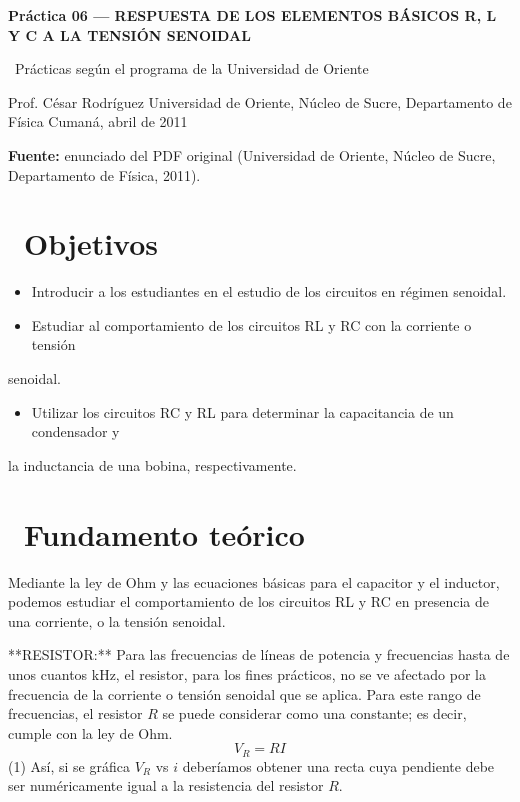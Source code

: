 \documentclass[11pt,a4paper]{article}
\newcommand{\iconoBanda}{microchip}
\newcommand{\bandaTitulo}[3][fondoOscuro]{%
  \begin{tcolorbox}[
    enhanced,
    colback=#1, colframe=#1,
    boxrule=0pt, arc=8pt, outer arc=8pt,
    width=\linewidth,
    top=18pt, bottom=6pt, left=14pt, right=14pt,
    borderline south={3.5pt}{0pt}{cyanNeon},
  ]
    \begin{minipage}[c]{0.07\linewidth}
      \centering
      \textcolor{cyanNeon}{\fontsize{30}{30}\selectfont\faIcon{\iconoBanda}}
    \end{minipage}%
    \hspace{8pt}%
    \begin{minipage}[c]{0.88\linewidth}
      {\fontsize{20}{24}\selectfont\bfseries\color{white}#2}\par\vspace{5pt}%
      \textcolor{cyanNeon!80!white}{\small\faIcon{angle-right}~#3}%
    \end{minipage}
    \vspace{4pt}
  \end{tcolorbox}%
  \vspace{8pt}%
}
\newcommand{\iconotexto}[2]{\textcolor{cyanNeon}{\faIcon{#1}}~#2}
\renewcommand{\iconoBanda}{flask}
\begin{document}
\bandaTitulo[fondoOscuro]{Práctica 06 --- RESPUESTA DE LOS ELEMENTOS BÁSICOS R, L Y C A LA TENSIÓN SENOIDAL}{Prácticas según el programa de la Universidad de Oriente}

\begin{center}\small\color{grisTexto}Prof. César Rodríguez \textbar{} Universidad de Oriente, Núcleo de Sucre, Departamento de Física \textbar{} Cumaná, abril de 2011\end{center}

\begin{tcolorbox}[cajaContenido]\textbf{Fuente:} enunciado del PDF original (Universidad de Oriente, Núcleo de Sucre, Departamento de Física, 2011).
\end{tcolorbox}

\section{\iconotexto{bullseye}{Objetivos}}

\begin{itemize}[leftmargin=1.4em,itemsep=2pt,topsep=3pt]
  \item Introducir a los estudiantes en el estudio de los circuitos en régimen senoidal.
  \item Estudiar al comportamiento de los circuitos RL y RC con la corriente o tensión
\end{itemize}

senoidal.

\begin{itemize}[leftmargin=1.4em,itemsep=2pt,topsep=3pt]
  \item Utilizar los circuitos RC y RL para determinar la capacitancia de un condensador y
\end{itemize}

la inductancia de una bobina, respectivamente.

\section{\iconotexto{book-open}{Fundamento teórico}}

Mediante la ley de Ohm y las ecuaciones básicas para el capacitor y el inductor, podemos estudiar el comportamiento de los circuitos RL y RC en presencia de una corriente, o la tensión senoidal.

**RESISTOR:** Para las frecuencias de líneas de potencia y frecuencias hasta de unos cuantos kHz, el resistor, para los fines prácticos, no se ve afectado por la frecuencia de la corriente o tensión senoidal que se aplica. Para este rango de frecuencias, el resistor $R$ se puede considerar como una constante; es decir, cumple con la ley de Ohm. \[ V_R = RI \] (1) Así, si se gráfica $V_R$ vs $i$ deberíamos obtener una recta cuya pendiente debe ser numéricamente igual a la resistencia del resistor $R$.
\end{document}
